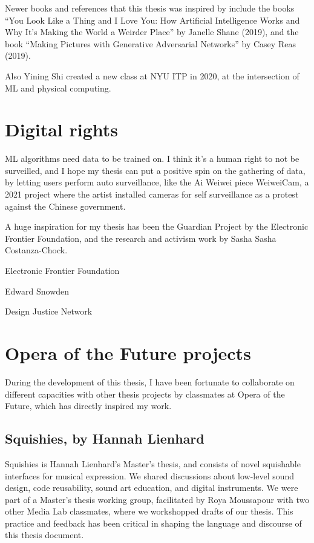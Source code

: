 Newer books and references that this thesis was inspired by include the books “You Look Like a Thing and I Love You: How Artificial Intelligence Works and Why It's Making the World a Weirder Place” by Janelle Shane (2019), and the book “Making Pictures with Generative Adversarial Networks” by Casey Reas (2019).

Also Yining Shi created a new class at \acrshort{NYU} \acrshort{ITP} in 2020, at the intersection of \acrshort{ML} and physical computing.

\section{Digital rights}

\acrshort{ML} algorithms need data to be trained on. I think it’s a human right to not be surveilled, and I hope my thesis can put a positive spin on the gathering of data, by letting users perform auto surveillance, like the Ai Weiwei piece WeiweiCam, a 2021 project where the artist installed cameras for self surveillance as a protest against the Chinese government.

A huge inspiration for my thesis has been the Guardian Project by the Electronic Frontier Foundation, and the research and activism work by Sasha Sasha Costanza-Chock.

Electronic Frontier Foundation

Edward Snowden

Design Justice Network

\section{Opera of the Future projects}

During the development of this thesis, I have been fortunate to collaborate on different capacities with other thesis projects by classmates at Opera of the Future, which has directly inspired my work.

\subsection{Squishies, by Hannah Lienhard}

Squishies is Hannah Lienhard's Master's thesis, and consists of novel squishable interfaces for musical expression. We shared discussions about low-level sound design, code reusability, sound art education, and digital instruments. We were part of a Master's thesis working group, facilitated by Roya Moussapour with two other Media Lab classmates, where we workshopped drafts of our thesis. This practice and feedback has been critical in shaping the language and discourse of this thesis document.

